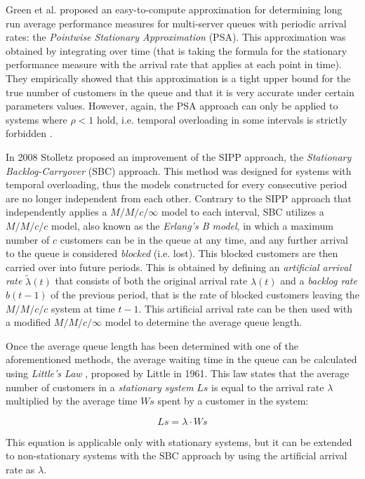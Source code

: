 Green et al.\cite{green1991} proposed an easy-to-compute approximation for determining long run average performance measures for multi-server queues with periodic arrival rates: the \emph{Pointwise Stationary Approximation} (PSA). This approximation was obtained by integrating over time (that is taking the formula for the stationary performance measure with the arrival rate that applies at each point in time). They empirically showed that this approximation is a tight upper bound for the true number of customers in the queue and that it is very accurate under certain parameters values. However, again, the PSA approach can only be applied to systems where \( \rho < 1 \) hold, i.e. temporal overloading in some intervals is strictly forbidden \cite{stolletz}.

In 2008 Stolletz \cite{stolletz} proposed an improvement of the SIPP approach, the \emph{Stationary Backlog-Carryover} (SBC) approach. This method was designed for systems with temporal overloading, thus the models constructed for every consecutive period are no longer independent from each other. Contrary to the SIPP approach that independently applies a \( M/M/c/\infty \) model to each interval, SBC utilizes a \( M/M/c/c \) model, also known as the \emph{Erlang’s B model}, in which a maximum number of \( c \) customers can be in the queue at any time, and any further arrival to the queue is considered \emph{blocked} (i.e. lost). This blocked customers are then carried over into future periods. This is obtained by defining an \emph{artificial arrival rate} \( \widetilde{\lambda}(t) \) that consists of both the original arrival rate \( \lambda(t) \) and a \emph{backlog rate} \( b(t-1) \) of the previous period, that is the rate of blocked customers leaving the \( M/M/c/c \) system at time \( t-1 \). This artificial arrival rate can be then used with a modified \( M/M/c/\infty \) model to determine the average queue length.

Once the average queue length has been determined with one of the aforementioned methods, the average waiting time in the queue can be calculated using \emph{Little’s Law} \cite{little}, proposed by Little in 1961. This law states that the average number of customers in a \emph{stationary system} \( Ls \) is equal to the arrival rate \( \lambda \) multiplied by the average time \( Ws \) spent by a customer in the system:

\begin{equation}
  Ls = \lambda \cdot Ws
  \label{eq:little_law}
\end{equation}

This equation is applicable only with stationary systems, but it can be extended to non-stationary systems with the SBC approach by using the artificial arrival rate as \( \lambda \).

\clearpage